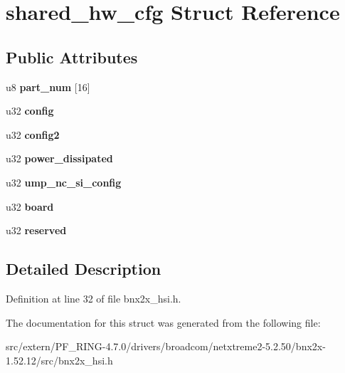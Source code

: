 \hypertarget{structshared__hw__cfg}{
\section{shared\_\-hw\_\-cfg Struct Reference}
\label{structshared__hw__cfg}
}
\subsection*{Public Attributes}
\begin{DoxyCompactItemize}
\item 
\hypertarget{structshared__hw__cfg_a3eaf35ad5c7d5f1f515053cbc4d96fb5}{
u8 {\bfseries part\_\-num} \mbox{[}16\mbox{]}}
\label{structshared__hw__cfg_a3eaf35ad5c7d5f1f515053cbc4d96fb5}

\item 
\hypertarget{structshared__hw__cfg_a035297ed220883f69e798f01d1670f65}{
u32 {\bfseries config}}
\label{structshared__hw__cfg_a035297ed220883f69e798f01d1670f65}

\item 
\hypertarget{structshared__hw__cfg_a864558129bcdf65ce9cdc21e323c976b}{
u32 {\bfseries config2}}
\label{structshared__hw__cfg_a864558129bcdf65ce9cdc21e323c976b}

\item 
\hypertarget{structshared__hw__cfg_a2d3336be5e32d32cac7cb252de85d16b}{
u32 {\bfseries power\_\-dissipated}}
\label{structshared__hw__cfg_a2d3336be5e32d32cac7cb252de85d16b}

\item 
\hypertarget{structshared__hw__cfg_a57b39535eb4daab1b92b7f39f7e556ff}{
u32 {\bfseries ump\_\-nc\_\-si\_\-config}}
\label{structshared__hw__cfg_a57b39535eb4daab1b92b7f39f7e556ff}

\item 
\hypertarget{structshared__hw__cfg_ab806ee1b500170a3672591a633bd3b1a}{
u32 {\bfseries board}}
\label{structshared__hw__cfg_ab806ee1b500170a3672591a633bd3b1a}

\item 
\hypertarget{structshared__hw__cfg_ab6c2a35b87664e9538e31bc14ec7c66f}{
u32 {\bfseries reserved}}
\label{structshared__hw__cfg_ab6c2a35b87664e9538e31bc14ec7c66f}

\end{DoxyCompactItemize}


\subsection{Detailed Description}


Definition at line 32 of file bnx2x\_\-hsi.h.



The documentation for this struct was generated from the following file:\begin{DoxyCompactItemize}
\item 
src/extern/PF\_\-RING-\/4.7.0/drivers/broadcom/netxtreme2-\/5.2.50/bnx2x-\/1.52.12/src/bnx2x\_\-hsi.h\end{DoxyCompactItemize}
